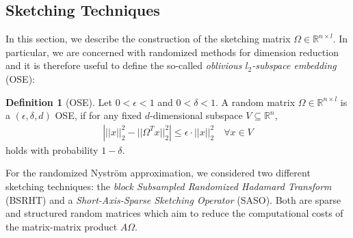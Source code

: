 \documentclass{article}
\theoremstyle{definition}
\newtheorem{definition}{Definition}[section]
\begin{document}
\subsection{Sketching Techniques}
In this section, we describe the construction of the sketching matrix $\Omega \in \mathbb{R}^{n \times l}$. In particular, we are concerned with randomized methods for dimension reduction and it is therefore useful to define the so-called \textit{oblivious $l_2$-subspace embedding} (OSE):
\begin{definition}[OSE]
    Let $0 < \epsilon < 1$ and $0 < \delta < 1$. A random matrix $\Omega \in \mathbb{R}^{n \times l}$ is a $(\epsilon, \delta, d)$ OSE, if for any fixed $d$-dimensional subspace $V \subseteq \mathbb{R}^{n}$, 
    \begin{align*}
        \left| ||x||_2^2 - ||\Omega^T x||_2^2 \right| \leq \epsilon \cdot ||x||_2^2
        \quad \forall x \in V 
    \end{align*}
    holds with probability $1 - \delta$.
\end{definition}

For the randomized Nyström approximation, we considered two different sketching techniques: the \textit{block Subsampled Randomized Hadamard Transform} (BSRHT) and a \textit{Short-Axis-Sparse Sketching Operator} (SASO). Both are sparse and structured random matrices which aim to reduce the computational costs of the matrix-matrix product $A \Omega$.
\end{document}
